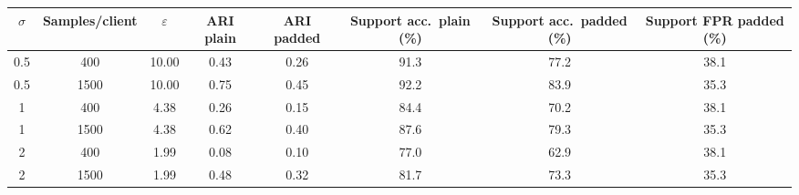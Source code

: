 \scriptsize
\setlength{\tabcolsep}{3pt}
\begin{tabular}{cccccccc}
\toprule
$\sigma$ & Samples/client & $\varepsilon$ & ARI plain & ARI padded & Support acc.\ plain (\%) & Support acc.\ padded (\%) & Support FPR padded (\%) \\
\midrule
0.5 & 400 & 10.00 & 0.43 & 0.26 & 91.3 & 77.2 & 38.1 \\
0.5 & 1500 & 10.00 & 0.75 & 0.45 & 92.2 & 83.9 & 35.3 \\
1 & 400 & 4.38 & 0.26 & 0.15 & 84.4 & 70.2 & 38.1 \\
1 & 1500 & 4.38 & 0.62 & 0.40 & 87.6 & 79.3 & 35.3 \\
2 & 400 & 1.99 & 0.08 & 0.10 & 77.0 & 62.9 & 38.1 \\
2 & 1500 & 1.99 & 0.48 & 0.32 & 81.7 & 73.3 & 35.3 \\
\bottomrule
\end{tabular}
